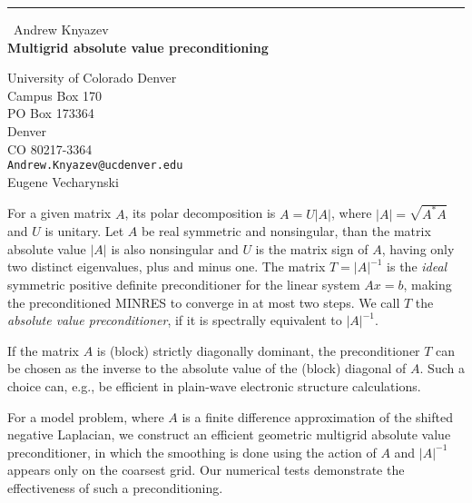\documentclass{report}
\begin{document}
\begin{center}
\rule{6in}{1pt} \
{\large Andrew Knyazev \\
{\bf Multigrid absolute value preconditioning}}

University of Colorado Denver \\ Campus Box 170 \\ PO Box 173364 \\ Denver \\ CO 80217-3364
\\
{\tt Andrew.Knyazev@ucdenver.edu}\\
Eugene Vecharynski\end{center}

For a given matrix $A$, its polar decomposition is $A=U|A|$, where
$|A|=\sqrt{A^*A}$ and $U$ is unitary. Let $A$ be real symmetric and
nonsingular, than the matrix absolute value $|A|$ is also nonsingular and
$U$ is the matrix sign of $A$, having only two distinct eigenvalues, plus
and minus one. The matrix $T=|A|^{-1}$ is the \emph{ideal} symmetric
positive definite preconditioner for the linear system $Ax=b$, making the
preconditioned MINRES to converge in at most two steps. We call $T$ the
\emph{absolute value preconditioner}, if it is spectrally equivalent to
$|A|^{-1}$.

If the matrix $A$ is (block) strictly diagonally dominant, the
preconditioner $T$ can be chosen as the inverse to the absolute value of
the (block) diagonal of $A$. Such a choice can, e.g., be efficient in
plain-wave electronic structure calculations.

For a model problem, where $A$ is a finite difference approximation of
the shifted negative Laplacian, we construct an efficient geometric
multigrid absolute value preconditioner, in which the smoothing is done
using the action of $A$ and $|A|^{-1}$ appears only on the coarsest grid.
Our numerical tests demonstrate the effectiveness of such a
preconditioning.
\end{document}
